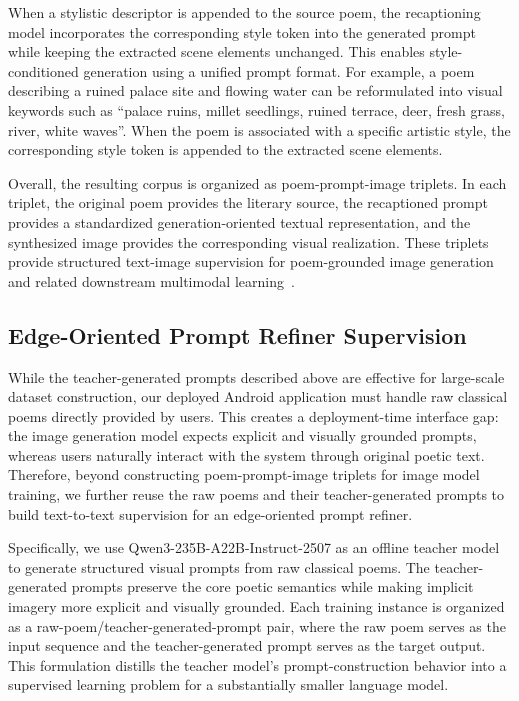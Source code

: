 When a stylistic descriptor is appended to the source poem, the recaptioning model incorporates the corresponding style token into the generated prompt while keeping the extracted scene elements unchanged. This enables style-conditioned generation using a unified prompt format. For example, a poem describing a ruined palace site and flowing water can be reformulated into visual keywords such as “palace ruins, millet seedlings, ruined terrace, deer, fresh grass, river, white waves”. When the poem is associated with a specific artistic style, the corresponding style token is appended to the extracted scene elements.

Overall, the resulting corpus is organized as poem-prompt-image triplets. In each triplet, the original poem provides the literary source, the recaptioned prompt provides a standardized generation-oriented textual representation, and the synthesized image provides the corresponding visual realization. These triplets provide structured text-image supervision for poem-grounded image generation and related downstream multimodal learning~\cite{liu2023bdm,chinese-clip}.

\subsection{Edge-Oriented Prompt Refiner Supervision}

While the teacher-generated prompts described above are effective for large-scale dataset construction, our deployed Android application must handle raw classical poems directly provided by users. This creates a deployment-time interface gap: the image generation model expects explicit and visually grounded prompts, whereas users naturally interact with the system through original poetic text. Therefore, beyond constructing poem-prompt-image triplets for image model training, we further reuse the raw poems and their teacher-generated prompts to build text-to-text supervision for an edge-oriented prompt refiner.

Specifically, we use Qwen3-235B-A22B-Instruct-2507 as an offline teacher model to generate structured visual prompts from raw classical poems. The teacher-generated prompts preserve the core poetic semantics while making implicit imagery more explicit and visually grounded. Each training instance is organized as a raw-poem/teacher-generated-prompt pair, where the raw poem serves as the input sequence and the teacher-generated prompt serves as the target output. This formulation distills the teacher model's prompt-construction behavior into a supervised learning problem for a substantially smaller language model.

